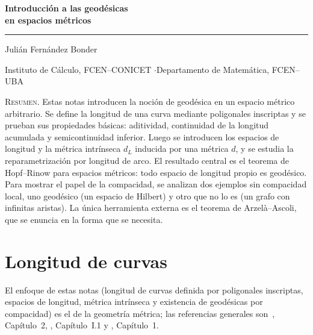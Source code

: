 \documentclass[12pt, a4paper]{amsart}
\theoremstyle{definition}
\theoremstyle{remark}
\begin{document}
\thispagestyle{plain}
\begin{flushleft}
  {\color{icnavy}\fontsize{26}{29}\selectfont\bfseries
   Introducción a las geodésicas\\ en espacios métricos\par}
  \vspace{10pt}
  {\color{dmred}\rule{\textwidth}{1.2pt}}\par
  \vspace{6pt}
  {\color{icnavy!75}\large Julián Fernández Bonder\par}
  \vspace{3pt}
  {\color{icnavy!60}\small Instituto de Cálculo, FCEN--CONICET \quad$\cdot$\quad Departamento de Matemática, FCEN--UBA\par}
\end{flushleft}
\vspace{0.6cm}

\begin{center}
\begin{minipage}{0.88\textwidth}
\small
\textsc{Resumen.} Estas notas introducen la noción de geodésica en un espacio métrico arbitrario. Se define la longitud de una curva mediante poligonales inscriptas y se prueban sus propiedades básicas: aditividad, continuidad de la longitud acumulada y semicontinuidad inferior. Luego se introducen los espacios de longitud y la métrica intrínseca $d_L$ inducida por una métrica $d$, y se estudia la reparametrización por longitud de arco. El resultado central es el teorema de Hopf--Rinow para espacios métricos: todo espacio de longitud propio es geodésico. Para mostrar el papel de la compacidad, se analizan dos ejemplos sin compacidad local, uno geodésico (un espacio de Hilbert) y otro que no lo es (un grafo con infinitas aristas). La única herramienta externa es el teorema de Arzelà--Ascoli, que se enuncia en la forma que se necesita.
\end{minipage}
\end{center}
\vspace{0.6cm}


\section{Longitud de curvas}

El enfoque de estas notas (longitud de curvas definida por poligonales inscriptas, espacios de longitud, métrica intrínseca y existencia de geodésicas por compacidad) es el de la geometría métrica; las referencias generales son~\cite{BBI}, Capítulo~2, \cite{BH}, Capítulo~I.1 y \cite{Gromov}, Capítulo~1.
\end{document}
